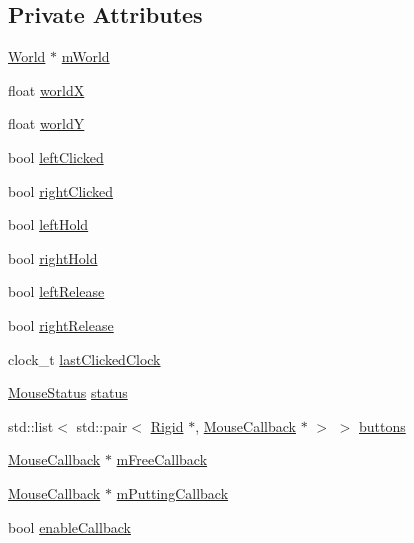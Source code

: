 \subsection*{Private Attributes}
\begin{DoxyCompactItemize}
\item 
\hyperlink{classWorld}{World} $\ast$ \hyperlink{classMouseHandler_a90ecdcff9ced6f454c66cad224a1e914}{m\+World}
\item 
float \hyperlink{classMouseHandler_a410ce28feb21ea6f6426c9f96f9bba2f}{world\+X}
\item 
float \hyperlink{classMouseHandler_ab3a5274610896b90da3adf48345cfa3a}{world\+Y}
\item 
bool \hyperlink{classMouseHandler_ae6ab60c2b4761c3e90bfaab2e305e41e}{left\+Clicked}
\item 
bool \hyperlink{classMouseHandler_a0f6f7ab59e4ad42bcaf7e6549ff6566f}{right\+Clicked}
\item 
bool \hyperlink{classMouseHandler_a42f557e16701dab03efb4f99374ea524}{left\+Hold}
\item 
bool \hyperlink{classMouseHandler_af2f5a2328ceb7ba92728c71076ceb813}{right\+Hold}
\item 
bool \hyperlink{classMouseHandler_a34bc772a5e68fe68bb57ae495ef1fe69}{left\+Release}
\item 
bool \hyperlink{classMouseHandler_a53838184bd9bc307e5429b551f96c1ac}{right\+Release}
\item 
clock\+\_\+t \hyperlink{classMouseHandler_a6c3cee7fc0ca734bace60b951fb96b14}{last\+Clicked\+Clock}
\item 
\hyperlink{classMouseHandler_af967315727aa1d435d55cc704e64fd1a}{Mouse\+Status} \hyperlink{classMouseHandler_a34fd395066a9b32fe9a966ec4e1d5ea6}{status}
\item 
std\+::list$<$ std\+::pair$<$ \hyperlink{classRigid}{Rigid} $\ast$, \hyperlink{classMouseCallback}{Mouse\+Callback} $\ast$ $>$ $>$ \hyperlink{classMouseHandler_acfb0584232c1d5b8a87028d3008133e3}{buttons}
\item 
\hyperlink{classMouseCallback}{Mouse\+Callback} $\ast$ \hyperlink{classMouseHandler_a8e23b23bd4415cd057636573f6e8db30}{m\+Free\+Callback}
\item 
\hyperlink{classMouseCallback}{Mouse\+Callback} $\ast$ \hyperlink{classMouseHandler_a23f5b0cedc9e4c87060dcd3e10b943f4}{m\+Putting\+Callback}
\item 
bool \hyperlink{classMouseHandler_a29da34736a6d4f948a536f4d95bb146e}{enable\+Callback}
\end{DoxyCompactItemize}


